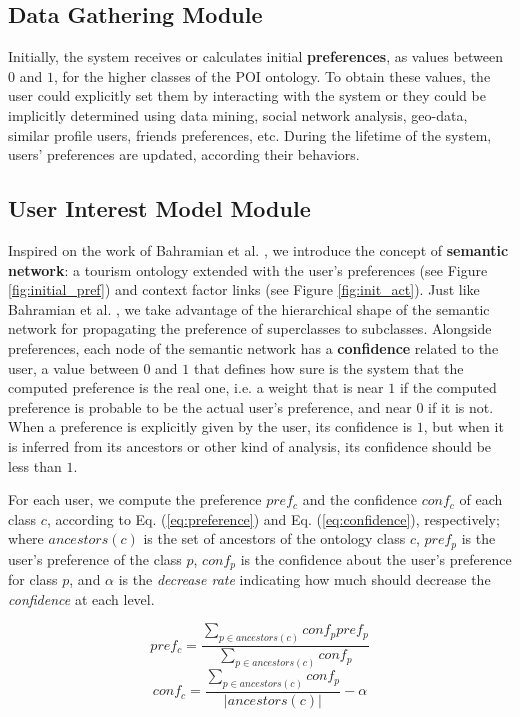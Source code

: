 \subsection{Data Gathering Module}
Initially, the system receives or calculates
initial \textbf{preferences}, as 
values between $0$ and $1$, for the higher classes of the POI ontology. To obtain these values, the user could explicitly set them by interacting with the system or they could be implicitly determined using data mining, social network analysis, geo-data, similar profile users, friends preferences, etc. During the lifetime of the system, users' preferences are updated, according their behaviors. 

\subsection{User Interest Model Module}
Inspired on the work of Bahramian et al. \cite{bahramian_abbaspour_claramunt_2017}, we introduce the concept of \textbf{semantic network}: a tourism ontology extended with the user's preferences (see Figure \ref{fig:initial_pref}) and context factor links
(see Figure \ref{fig:init_act}). Just like Bahramian et al. \cite{bahramian_abbaspour_claramunt_2017}, we take advantage of the hierarchical shape of the semantic network for propagating the preference of superclasses to subclasses. Alongside preferences, each node of the semantic network has a \textbf{confidence} related to the user, a value between $0$ and $1$ that defines how sure is the system that the computed preference is the real one, i.e. a weight that is near $1$ if the computed preference is probable to be the actual user's preference, and near $0$ if it is not. When a preference is explicitly given by the user, its confidence is $1$, but when it is inferred from its ancestors or other kind of analysis, its confidence should be less than $1$. 

For each user, we compute the preference $pref_c$ and the confidence $conf_c$ of each class $c$, according to Eq. (\ref{eq:preference}) and Eq. (\ref{eq:confidence}), respectively; 
where $ancestors(c)$ is the set of ancestors of the ontology class $c$, $pref_p$ is the user's preference of the class $p$, $conf_p$ is the confidence about the user's preference for
class $p$, and $\alpha$ is the \textit{decrease rate} indicating
how much should decrease the \textit{confidence} at each level. 

\begin{equation} \label{eq:preference}
    pref_c = \frac{\displaystyle \sum_{p \in ancestors(c)}{conf_p pref_p}}
    {\displaystyle  \sum_{p \in ancestors(c)} {conf_p}}
\end{equation}
\begin{equation} \label{eq:confidence}
    conf_c = \frac{\displaystyle \sum_{p \in ancestors(c)} {conf_p}}{|ancestors(c)|} - \alpha
\end{equation}

